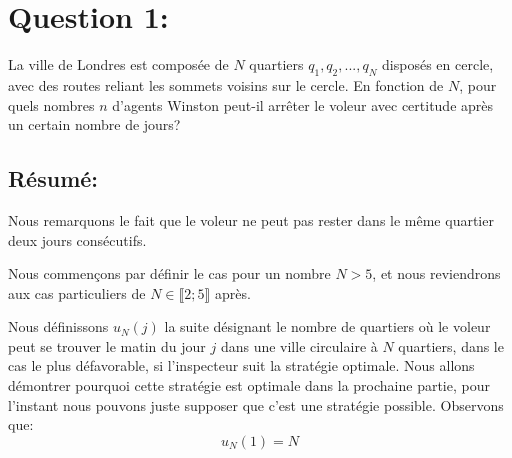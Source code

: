 \tableofcontents

\clearpage
\section{Question 1:}
\begin{enonce}
La ville de Londres est composée de $N$ quartiers $q_1,q_2,...,q_N$ disposés en cercle, avec des routes reliant les sommets voisins sur le cercle. En fonction de $N$, pour quels nombres $n$ d'agents Winston peut-il arrêter le voleur avec certitude après un certain nombre de jours?
\end{enonce}
\subsection{Résumé:}
Nous remarquons le fait que le voleur ne peut pas rester dans le même quartier deux jours consécutifs.

\medskip

Nous commençons par définir le cas pour un nombre $N>5$, et nous reviendrons aux cas particuliers de $N\in\llbracket 2;5\rrbracket$ après.

\medskip

Nous définissons $u_N(j)$ la suite désignant le nombre de quartiers où le voleur peut se trouver le matin du jour $j$ dans une ville circulaire à $N$ quartiers, dans le cas le plus défavorable, si l'inspecteur suit la stratégie optimale. Nous allons démontrer pourquoi cette stratégie est optimale dans la prochaine partie, pour l'instant nous pouvons juste supposer que c'est une stratégie possible.
Observons que:
$$u_N(1)=N$$
